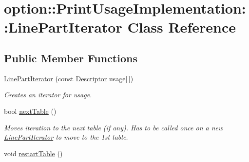 \hypertarget{classoption_1_1_print_usage_implementation_1_1_line_part_iterator}{\section{option\-:\-:\-Print\-Usage\-Implementation\-:\-:\-Line\-Part\-Iterator \-Class \-Reference}
\label{classoption_1_1_print_usage_implementation_1_1_line_part_iterator}
}
\subsection*{\-Public \-Member \-Functions}
\begin{DoxyCompactItemize}
\item 
\hypertarget{classoption_1_1_print_usage_implementation_1_1_line_part_iterator_a8a61fef9ba907fd4e10ff0fd772ee5e7}{\hyperlink{classoption_1_1_print_usage_implementation_1_1_line_part_iterator_a8a61fef9ba907fd4e10ff0fd772ee5e7}{\-Line\-Part\-Iterator} (const \hyperlink{structoption_1_1_descriptor}{\-Descriptor} usage\mbox{[}$\,$\mbox{]})}\label{classoption_1_1_print_usage_implementation_1_1_line_part_iterator_a8a61fef9ba907fd4e10ff0fd772ee5e7}

\begin{DoxyCompactList}\small\item\em \-Creates an iterator for {\ttfamily usage}. \end{DoxyCompactList}\item 
bool \hyperlink{classoption_1_1_print_usage_implementation_1_1_line_part_iterator_afe43ca12d399ed3c871e4dc5bf63356e}{next\-Table} ()
\begin{DoxyCompactList}\small\item\em \-Moves iteration to the next table (if any). \-Has to be called once on a new \hyperlink{classoption_1_1_print_usage_implementation_1_1_line_part_iterator}{\-Line\-Part\-Iterator} to move to the 1st table. \end{DoxyCompactList}\item 
\hypertarget{classoption_1_1_print_usage_implementation_1_1_line_part_iterator_a0cbe8ed79ab4958a70b957598dd76fa6}{void \hyperlink{classoption_1_1_print_usage_implementation_1_1_line_part_iterator_a0cbe8ed79ab4958a70b957598dd76fa6}{restart\-Table} ()}\label{classoption_1_1_print_usage_implementation_1_1_line_part_iterator_a0cbe8ed79ab4958a70b957598dd76fa6}


\end{DoxyCompactItemize}
